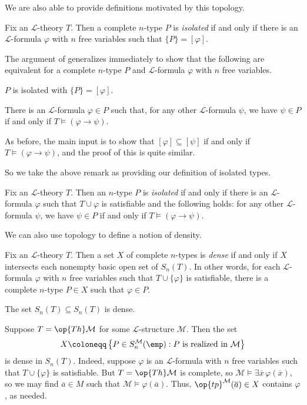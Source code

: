 \documentclass[../notes.tex]{subfiles}
\begin{document}
We are also able to provide definitions motivated by this topology.
\begin{definition}[isolated]
	Fix an $\mathcal L$-theory $T$. Then a complete $n$-type $P$ is \textit{isolated} if and only if there is an $\mathcal L$-formula $\varphi$ with $n$ free variables such that $\{P\}=[\varphi]$.
\end{definition}
\begin{remark}
	The argument of  generalizes immediately to show that the following are equivalent for a complete $n$-type $P$ and $\mathcal L$-formula $\varphi$ with $n$ free variables.
	\begin{listalph}
		\item $P$ is isolated with $\{P\}=[\varphi]$.
		\item There is an $\mathcal L$-formula $\varphi\in P$ such that, for any other $\mathcal L$-formula $\psi$, we have $\psi\in P$ if and only if $T\models(\varphi\to\psi)$.
	\end{listalph}
	As before, the main input is to show that $[\varphi]\subseteq[\psi]$ if and only if $T\models(\varphi\to\psi)$, and the proof of this is quite similar.
\end{remark}
So we take the above remark as providing our definition of isolated types.
\begin{definition}[isolated]
	Fix an $\mathcal L$-theory $T$. Then an $n$-type $P$ is \textit{isolated} if and only if there is an $\mathcal L$-formula $\varphi$ such that $T\cup\varphi$ is satisfiable and the following holds: for any other $\mathcal L$-formula $\psi$, we have $\psi\in P$ if and only if $T\models(\varphi\to\psi)$.
\end{definition}
We can also use topology to define a notion of density.
\begin{definition}[dense]
	Fix an $\mathcal L$-theory $T$. Then a set $X$ of complete $n$-types is \textit{dense} if and only if $X$ intersects each nonempty basic open set of $S_n(T)$. In other words, for each $\mathcal L$-formula $\varphi$ with $n$ free variables such that $T\cup\{\varphi\}$ is satisfiable, there is a complete $n$-type $P\in X$ such that $\varphi\in P$.
\end{definition}
\begin{example}
	The set $S_n(T)\subseteq S_n(T)$ is dense.
\end{example}
\begin{example}
	Suppose $T=\op{Th}\mathcal M$ for some $\mathcal L$-structure $\mathcal M$. Then the set
	\[X\coloneqq\left\{P\in S_n^{\mathcal M}(\emp):P\text{ is realized in }\mathcal M\right\}\]
	is dense in $S_n(T)$. Indeed, suppose $\varphi$ is an $\mathcal L$-formula with $n$ free variables such that $T\cup\{\varphi\}$ is satisfiable. But $T=\op{Th}\mathcal M$ is complete, so $\mathcal M\models\exists\overline x\,\varphi(\overline x)$, so we may find $\overline a\in M$ such that $\mathcal M\models\varphi(\overline a)$. Thus, $\op{tp}^{\mathcal M}(\overline a)\in X$ contains $\varphi$, as needed.
\end{example}
\end{document}
